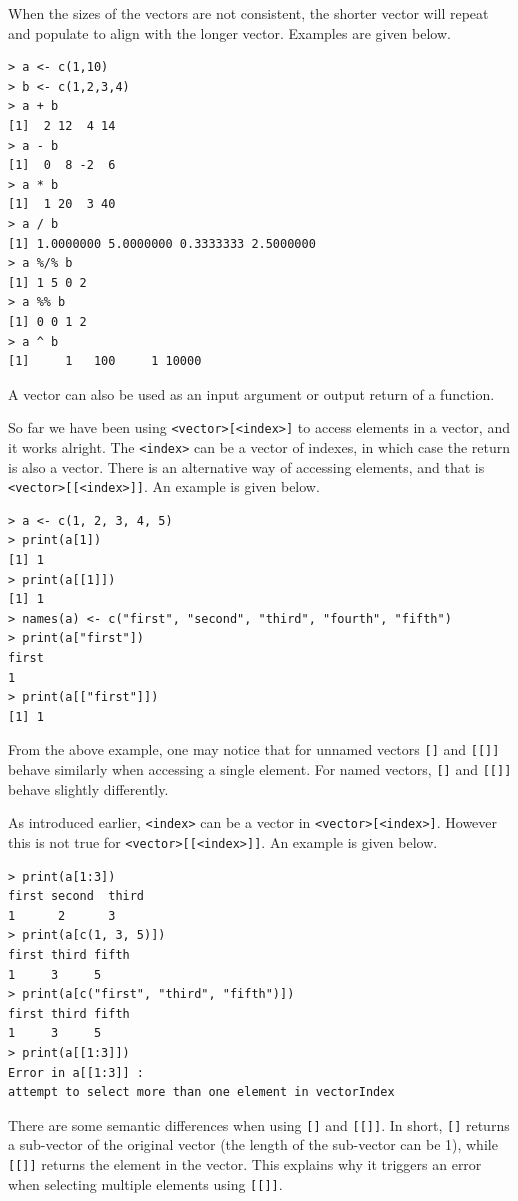 When the sizes of the vectors are not consistent, the shorter vector will repeat and populate to align with the longer vector. Examples are given below.
\begin{lstlisting}
> a <- c(1,10)
> b <- c(1,2,3,4)
> a + b
[1]  2 12  4 14
> a - b
[1]  0  8 -2  6
> a * b
[1]  1 20  3 40
> a / b
[1] 1.0000000 5.0000000 0.3333333 2.5000000
> a %/% b
[1] 1 5 0 2
> a %% b
[1] 0 0 1 2
> a ^ b
[1]     1   100     1 10000
\end{lstlisting}

A vector can also be used as an input argument or output return of a function.

\begin{mdframed}

So far we have been using \verb|<vector>[<index>]| to access elements in a vector, and it works alright. The \verb|<index>| can be a vector of indexes, in which case the return is also a vector. There is an alternative way of accessing elements, and that is \verb|<vector>[[<index>]]|. An example is given below.

\begin{lstlisting}
> a <- c(1, 2, 3, 4, 5)
> print(a[1])
[1] 1
> print(a[[1]])
[1] 1
> names(a) <- c("first", "second", "third", "fourth", "fifth")
> print(a["first"])
first 
1 
> print(a[["first"]])
[1] 1
\end{lstlisting}

From the above example, one may notice that for unnamed vectors \verb|[]| and \verb|[[]]| behave similarly when accessing a single element. For named vectors, \verb|[]| and \verb|[[]]| behave slightly differently. 

As introduced earlier, \verb|<index>| can be a vector in  \verb|<vector>[<index>]|. However this is not true for \verb|<vector>[[<index>]]|. An example is given below.
\begin{lstlisting}
> print(a[1:3])
first second  third 
1      2      3 
> print(a[c(1, 3, 5)])
first third fifth 
1     3     5 
> print(a[c("first", "third", "fifth")])
first third fifth 
1     3     5 
> print(a[[1:3]])
Error in a[[1:3]] : 
attempt to select more than one element in vectorIndex
\end{lstlisting}

There are some semantic differences when using \verb|[]| and \verb|[[]]|. In short, \verb|[]| returns a sub-vector of the original vector (the length of the sub-vector can be 1), while \verb|[[]]| returns the element in the vector. This explains why it triggers an error when selecting multiple elements using \verb|[[]]|. 


\end{mdframed}

